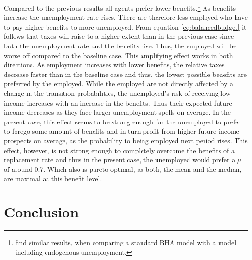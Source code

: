 \documentclass[a4paper,12pt]{article}
\begin{document}
Compared to the previous results all agents prefer lower benefits.\footnote{\cite{KrusellMukoyamaSahin} find similar results, when comparing a standard BHA model with a model including endogenous unemployment.} 
As benefits increase the unemployment rate rises. There are therefore less employed who have to pay higher benefits to more unemployed. From equation \eqref{eq:balancedbudget} it follows that taxes will raise to a higher extent than in the previous case since both the unemployment rate and the benefits rise. Thus, the employed will be worse off compared to the baseline case. This amplifying effect works in both directions. As employment increases with lower benefits, the relative taxes decrease faster than in the baseline case and thus, the lowest possible benefits are preferred by the employed. 
While the employed are not directly affected by a change in the transition probabilities, the unemployed's risk of receiving low income increases with an increase in the benefits. Thus their expected future income decreases as they face larger unemployment spells on average. In the present case, this effect seems to be strong enough for the unemployed to prefer to forego some amount of benefits and in turn profit from higher future income prospects on average, as the probability to being employed next period rises. This effect, however, is not strong enough to completely overcome the benefits of a replacement rate and thus in the present case, the unemployed would prefer a $\mu$ of around 0.7. Which also is pareto-optimal, as both, the mean and the median, are maximal at this benefit level. 


\section{Conclusion}
\end{document}
